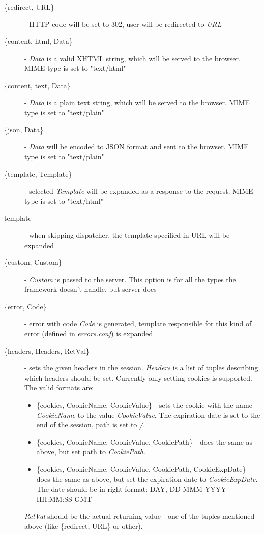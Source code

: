 \begin{description}
\item[\{redirect, URL\}]- HTTP code will be set to 302, user will be redirected to {\it URL}
\item[\{content, html, Data\}]- {\it Data} is a valid XHTML string, which will be served to the browser. MIME type is set to "text/html"
\item[\{content, text, Data\}]- {\it Data} is a plain text string, which will be served to the browser. MIME type is set to "text/plain"
\item[\{json, Data\}]- {\it Data} will be encoded to JSON format and sent to the browser. MIME type is set to "text/plain"
\item[\{template, Template\}]- selected {\it Template} will be expanded as a response to the request. MIME type is set to "text/html"
\item[template]- when skipping dispatcher, the template specified in URL will be expanded
\item[\{custom, Custom\}]- {\it Custom} is passed to the server. This option is for all the types the framework doesn't handle, but server does
\item[\{error, Code\}]- error with code {\it Code} is generated, template responsible for this kind of error (defined in {\it errors.conf}) is expanded
\item[\{headers, Headers, RetVal\}]- sets the given headers in the session. {\it Headers} is a list of tuples describing which headers should be set. Currently only setting cookies is supported. 
The valid formats are:
\begin{itemize}
\item \{cookies, CookieName, CookieValue\} - sets the cookie with the name {\it CookieName} to the value {\it CookieValue}. The expiration date is set to the end of the session, path is set to {\it /}.
\item \{cookies, CookieName, CookieValue, CookiePath\} - does the same as above, but set path to {\it CookiePath}.
\item \{cookies, CookieName, CookieValue, CookiePath, CookieExpDate\} - does the same as above, but set the expiration date to {\it CookieExpDate}. The date should be in right format: DAY, DD-MMM-YYYY HH:MM:SS GMT
\end{itemize}
{\it RetVal} should be the actual returning value - one of the tuples mentioned above (like \{redirect, URL\} or other).
\end{description} 
